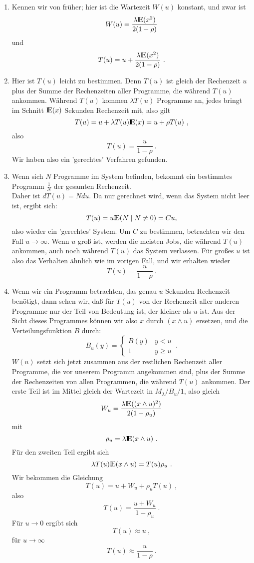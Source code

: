 \begin{enumerate}
\item Kennen wir von früher; hier ist die Wartezeit $W(u)$ konstant, und zwar ist
\[W(u) = \frac{\lambda {\rm I\kern-0.2em E}(x^{2})}{2(1-\rho)} \]
und
\[T(u) = u + \frac{\lambda {\rm I\kern-0.2em E}(x^{2})}{2(1-\rho)} ~.  \]
\item Hier ist $T(u)$ leicht zu bestimmen. Denn $T(u)$ ist gleich der Rechenzeit $u$ plus der Summe der Rechenzeiten aller Programme, die während $T(u)$
ankommen.
Während $T(u)$ kommen $\lambda T(u)$ Programme an, jedes bringt im Schnitt ${\rm I\kern-0.2em E}(x)$ Sekunden Rechenzeit mit, also gilt
\[T(u) = u + \lambda T(u){\rm I\kern-0.2em E}(x)=u + \rho T(u) ~,\]
also
\[T(u)=\frac{u}{1-\rho} ~. \]
Wir haben also ein 'gerechtes' Verfahren gefunden.
\item Wenn sich $N$ Programme im System befinden, bekommt ein bestimmtes Programm $\frac{1}{N}$ der gesamten Rechenzeit. \\
Daher ist $dT(u) = Ndu$. Da nur gerechnet wird, wenn das System nicht leer ist, ergibt sich:
\[ T(u)=u{\rm I\kern-0.2em E}(N \mid N \not= 0)=Cu, \]
also wieder ein 'gerechtes' System. Um $C$ zu bestimmen, betrachten wir den Fall $u \rightarrow \infty$. Wenn $u$ groß ist, werden die meisten Jobs, die während
$T(u)$ ankommen, auch noch während $T(u)$ das System verlassen. Für großes $u$ ist also das Verhalten ähnlich wie im vorigen Fall, und wir erhalten wieder
\[T(u)=\frac{u}{1-\rho} ~. \]
\item Wenn wir ein Programm betrachten, das genau $u$ Sekunden Rechenzeit benötigt, dann sehen wir, daß für $T(u)$ von der Rechenzeit aller anderen Programme
nur der Teil von Bedeutung ist, der kleiner als $u$ ist. Aus der Sicht dieses Programmes können wir also $x$ durch $(x \land u)$ ersetzen, und die
Verteilungsfunktion $B$ durch:
\[
B_{u}(y) =  \left\{
\begin{array}{lc}
B(y) & y<u \\
1 & y \geq u
\end{array} \right. ~.
\]
$W(u)$ setzt sich jetzt zusammen aus der restlichen Rechenzeit aller Programme, die vor unserem Programm angekommen sind, plus der Summe der Rechenzeiten von
allen Programmen, die während $T(u)$ ankommen. Der erste Teil ist im Mittel gleich der Wartezeit in $M_{\lambda}/B_{u}/1$, also gleich
\[W_{u}=\frac{\lambda {\rm I\kern-0.2em E}((x \land u)^{2})}{2(1-\rho _{u})}  \]
mit
\[\rho _{u}=\lambda {\rm I\kern-0.2em E}(x \wedge u) ~.\]
Für den zweiten Teil ergibt sich
\[\lambda T(u){\rm I\kern-0.2em E}(x \wedge u) = T(u)\rho _{u} ~.\]
Wir bekommen die Gleichung
\[T(u)=u+W_{u}+\rho _{u}T(u) ~,  \]
also
\[T(u)=\frac{u+W_{u}}{1-\rho_{u}} ~. \]
Für $u \rightarrow 0$ ergibt sich
\[T(u) \approx u ~, \]
für $u \rightarrow \infty$
\[T(u) \approx \frac{u}{1-\rho} ~. \]
\end{enumerate}

